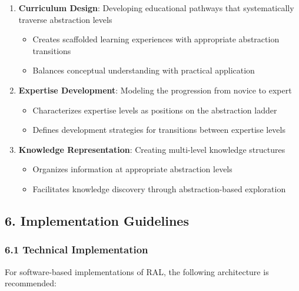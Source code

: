 \documentclass[
]{article}
\providecommand{\tightlist}{%
  \setlength{\itemsep}{0pt}\setlength{\parskip}{0pt}}
\begin{document}
\begin{enumerate}
\def\labelenumi{\arabic{enumi}.}
\tightlist
\item
  \textbf{Curriculum Design}: Developing educational pathways that
  systematically traverse abstraction levels

  \begin{itemize}
  \tightlist
  \item
    Creates scaffolded learning experiences with appropriate abstraction
    transitions
  \item
    Balances conceptual understanding with practical application
  \end{itemize}
\item
  \textbf{Expertise Development}: Modeling the progression from novice
  to expert

  \begin{itemize}
  \tightlist
  \item
    Characterizes expertise levels as positions on the abstraction
    ladder
  \item
    Defines development strategies for transitions between expertise
    levels
  \end{itemize}
\item
  \textbf{Knowledge Representation}: Creating multi-level knowledge
  structures

  \begin{itemize}
  \tightlist
  \item
    Organizes information at appropriate abstraction levels
  \item
    Facilitates knowledge discovery through abstraction-based
    exploration
  \end{itemize}
\end{enumerate}

\subsection{6. Implementation
Guidelines}\label{implementation-guidelines}

\subsubsection{6.1 Technical
Implementation}\label{technical-implementation}

For software-based implementations of RAL, the following architecture is
recommended:
\end{document}
